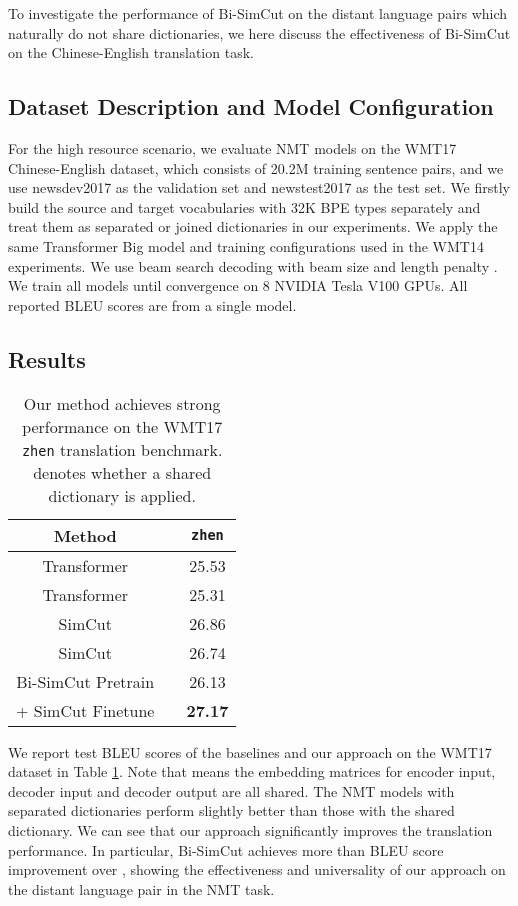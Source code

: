 \documentclass[11pt]{article}
\begin{document}
To investigate the performance of Bi-SimCut on the distant language pairs which naturally do not share dictionaries, we here discuss the effectiveness of Bi-SimCut on the Chinese-English translation task.

\subsection{Dataset Description and Model Configuration}

For the high resource scenario, we evaluate NMT models on the WMT17 Chinese-English dataset, which consists of 20.2M training sentence pairs, and we use newsdev2017 as the validation set and newstest2017 as the test set. We firstly build the source and target vocabularies with 32K BPE types separately and treat them as separated or joined dictionaries in our experiments. We apply the same Transformer Big model and training configurations used in the WMT14 experiments. We use beam search decoding with beam size  and length penalty . We train all models until convergence on 8 NVIDIA Tesla V100 GPUs. All reported BLEU scores are from a single model. 

\subsection{Results}

\begin{table}
\centering
\begin{tabular}{c|c|c}
\hline
Method &  & \texttt{zh}\texttt{en} \\
\hline\hline
Transformer &  & 25.53 \\
Transformer &  & 25.31 \\
\hline
SimCut &  & 26.86 \\ SimCut &  & 26.74 \\ Bi-SimCut Pretrain &  & 26.13 \\
+ SimCut Finetune &  & \bf 27.17 \\
\end{tabular}
\caption{Our method achieves strong performance on the WMT17 \texttt{zh}\texttt{en} translation benchmark.  denotes whether a shared dictionary is applied. \label{zhen}}
\end{table}

We report test BLEU scores of the baselines and our approach on the WMT17 dataset in Table \ref{zhen}. Note that  means the embedding matrices for encoder input, decoder input and decoder output are all shared.
The NMT models with separated dictionaries perform slightly better than those with the shared dictionary. We can see that our approach significantly improves the translation performance. In particular, Bi-SimCut achieves more than  BLEU score improvement over \citet{vaswani2017attention}, showing the effectiveness and universality of our approach on the distant language pair in the NMT task.
\end{document}
